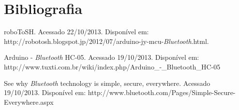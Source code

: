 \documentclass[portugues, brazil, a4paper,12pt]{article}
\begin{document}
\newpage
\section{Bibliografia}
\begin{thebibliography}{100} %

 roboToSH. Acessado 22/10/2013. Disponível em: http://robotosh.blogspot.jp/2012/07/arduino-jy-mcu-\textit{Bluetooth}.html.

 Arduino - \textit{Bluetooth} HC-05. Acessado 19/10/2013. Disponível em: http://www.tuxti.com.br/wiki/index.php/Arduino\_-\_Bluetooth\_HC-05

 See why \textit{Bluetooth} technology is simple, secure, everywhere. Acessado 19/10/2013. Disponível em: http://www.bluetooth.com/Pages/Simple-Secure-Everywhere.aspx
\end{thebibliography}
\end{document}

